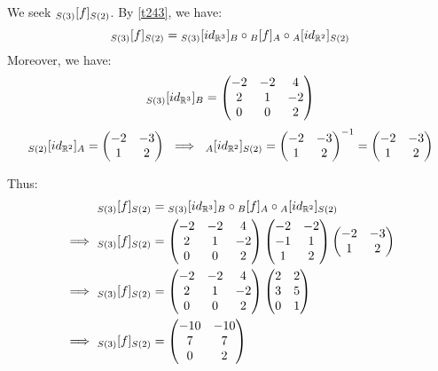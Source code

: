\documentclass{exam}
\begin{document}
\begin{questions}
We seek $\cript{f}{S(3)}{S(2)}$. By \eqref{t243}, we have:
\[
\cript{f}{S(3)}{S(2)} = \cript{id_{\mathbb{R}^3}}{S(3)}{B} \circ \cript{f}{B}{A} \circ \cript{id_{\mathbb{R}^2}}{A}{S(2)}
\]
Moreover, we have:
\[
 \cript{id_{\mathbb{R}^3}}{S(3)}{B} = \begin{pmatrix}
 -2 & -2 & 4 \\
 2 & 1 & -2 \\
 0 & 0 & 2
 \end{pmatrix}
\]
\[
 \cript{id_{\mathbb{R}^2}}{S(2)}{A} = \begin{pmatrix}
 -2 & -3 \\
 1 & 2 
 \end{pmatrix}
 \ \implies \
  \cript{id_{\mathbb{R}^2}}{A}{S(2)} = \begin{pmatrix}
 -2 & -3 \\
 1 & 2 
 \end{pmatrix}^{-1}
 = 
 \begin{pmatrix}
 -2 & -3 \\
 1 & 2 
 \end{pmatrix}
\]

Thus:
\begin{align*}
    &\cript{f}{S(3)}{S(2)} = \cript{id_{\mathbb{R}^3}}{S(3)}{B} \circ \cript{f}{B}{A} \circ \cript{id_{\mathbb{R}^2}}{A}{S(2)} \\
    \implies \ &\cript{f}{S(3)}{S(2)} = \begin{pmatrix}
 -2 & -2 & 4 \\
 2 & 1 & -2 \\
 0 & 0 & 2
 \end{pmatrix}
\begin{pmatrix}
-2 & -2 \\
-1 & 1 \\
1 & 2
\end{pmatrix}
 \begin{pmatrix}
 -2 & -3 \\
 1 & 2 
 \end{pmatrix}\\
 \implies \ &\cript{f}{S(3)}{S(2)} = \begin{pmatrix}
 -2 & -2 & 4 \\
 2 & 1 & -2 \\
 0 & 0 & 2
 \end{pmatrix}
\begin{pmatrix}
2 & 2 \\
3 & 5 \\
0 & 1
\end{pmatrix}
\\
\implies \ &\cript{f}{S(3)}{S(2)} = 
\begin{pmatrix}
-10 & -10 \\
7 & 7 \\
0 & 2
\end{pmatrix}
\\
\end{align*}

\end{questions}
\end{document}
